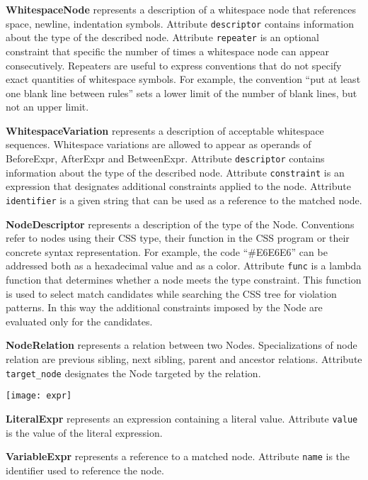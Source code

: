 \documentclass[parskip=full]{uvamscse}
\begin{document}
\begin{description}
\item\textbf{WhitespaceNode} represents a description of a whitespace node that references space, newline, indentation symbols. Attribute \texttt{descriptor} contains information about the type of the described node. Attribute \texttt{repeater} is an optional constraint that specific the number of times a whitespace node can appear consecutively. Repeaters are useful to express conventions that do not specify exact quantities of whitespace symbols. For example, the convention ``put at least one blank line between rules'' sets a lower limit of the number of blank lines, but not an upper limit.


\item\textbf{WhitespaceVariation} represents a description of acceptable whitespace sequences. Whitespace variations are allowed to appear as operands of BeforeExpr, AfterExpr and BetweenExpr.  Attribute \texttt{descriptor} contains information about the type of the described node. Attribute \texttt{constraint} is an expression that designates additional constraints applied to the node. Attribute \texttt{identifier} is a given string that can be used as a reference to the matched node.


\item\textbf{NodeDescriptor} represents a description of the type of the Node. Conventions refer to nodes using their CSS type, their function in the CSS program or their concrete syntax representation. For example, the code ``\#E6E6E6'' can be addressed both as a hexadecimal value and as a color. Attribute \texttt{func} is a lambda function that determines whether a node meets the type constraint. This function is used to select match candidates while searching the CSS tree for violation patterns. In this way the additional constraints imposed by the Node are evaluated only for the candidates.


\item\textbf{NodeRelation} represents a relation between two Nodes. Specializations of node relation are previous sibling, next sibling, parent and ancestor relations. Attribute \texttt{target\_node} designates the Node targeted by the relation.

\texttt{[image: expr]}

\item\textbf{LiteralExpr} represents an expression containing a literal value. Attribute \texttt{value} is the value of the literal expression.

\item\textbf{VariableExpr} represents a reference to a matched node. Attribute \texttt{name} is the identifier used to reference the node.


\end{description}
\end{document}
